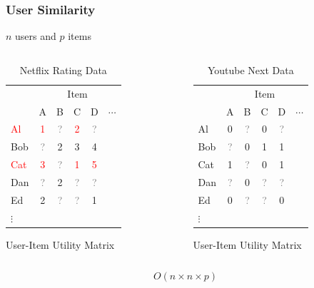 \documentclass[xcolor={dvipsnames}]{beamer}
\begin{document}
\frame
{
\frametitle{User Similarity}

$n$ users and $p$ items 

\begin{columns}
\begin{column}{.5\textwidth}

\begin{table}
\begin{tabular}{|l|ccccc|}
\hline
  & \multicolumn{5}{|c|}{Item} \\
    & A & B & C & D & $\cdots$ \\ \hline
\textcolor{red}{Al} & \textcolor{red}{1} & \textcolor{gray}{?} & \textcolor{red}{2 }& \textcolor{gray}{?} &\\ 
Bob & \textcolor{gray}{?} & 2 & 3 & 4 &\\ 
\textcolor{red}{Cat} & \textcolor{red}{3} & \textcolor{gray}{?} & \textcolor{red}{1} & \textcolor{red}{5}&\\ 
Dan & \textcolor{gray}{?} & 2 & \textcolor{gray}{?} & \textcolor{gray}{?}& \\
Ed & 2 &   \textcolor{gray}{?} & \textcolor{gray}{?} & 1&\\
$\vdots$ &&&&&\\ \hline
\end{tabular}
\caption{Netflix Rating Data}
User-Item Utility Matrix
\end{table}


\end{column}
\begin{column}{.5\textwidth}

\begin{table}
\begin{tabular}{|l|ccccc|}
\hline
  & \multicolumn{5}{|c|}{Item} \\
    & A & B & C & D & $\cdots$ \\ \hline
Al & 0 & \textcolor{gray}{?} & 0 & \textcolor{gray}{?} &\\
Bob & \textcolor{gray}{?} & 0 & 1 & 1 &\\
Cat & 1 & \textcolor{gray}{?} & 0 & 1&\\
Dan & \textcolor{gray}{?} & 0 & \textcolor{gray}{?} & \textcolor{gray}{?}& \\
Ed & 0 &   \textcolor{gray}{?} & \textcolor{gray}{?} & 0 &\\
$\vdots$ &&&&&\\ \hline
\end{tabular}
\caption{Youtube Next Data}
User-Item Utility Matrix
\end{table}


\end{column}
\end{columns}

\Huge
$$O(n\times  n \times p)$$

}
\end{document}

